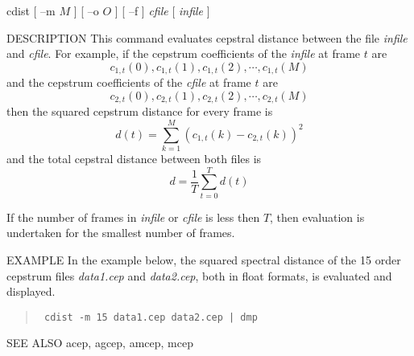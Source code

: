 
\begin{synopsis}
\item [cdist] [ --m $M$ ] [ --o $O$ ] [ --f ] {\em cfile}
 	    [ {\em infile} ] 
\end{synopsis}

\begin{qsection}{DESCRIPTION}
This command evaluates cepstral distance between the file {\em infile}
and {\em cfile}.
For example, if the cepstrum coefficients of the {\em infile} at
frame $t$ are 
\[c_{1,t}(0),c_{1,t}(1),c_{1,t}(2),\cdots,c_{1,t}(M)\]
and the cepstrum coefficients of the {\em cfile} at frame $t$ are
\[c_{2,t}(0),c_{2,t}(1),c_{2,t}(2),\cdots,c_{2,t}(M)\]
then the squared cepstrum distance for every frame is
\[d(t)=\sum_{k=1}^{M} (c_{1,t}(k)-c_{2,t}(k))^2\]
and the total cepstral distance between both files is
\[d=\frac{1}{T} \sum_{t=0}^{T} d(t)\]

If the number of frames in {\em infile} or {\em cfile} is less
then $T$, then evaluation is undertaken for the smallest number of frames.
\end{qsection}

\begin{options}
\end{options}

\begin{qsection}{EXAMPLE}
In the example below, the squared spectral distance of the 15 order
cepstrum files {\em data1.cep} and {\em data2.cep},
both in float formats, is evaluated and displayed.
\begin{quote}
\verb! cdist -m 15 data1.cep data2.cep | dmp !
\end{quote}
\end{qsection}

\begin{qsection}{SEE ALSO}
acep, agcep, amcep, mcep
\end{qsection}
